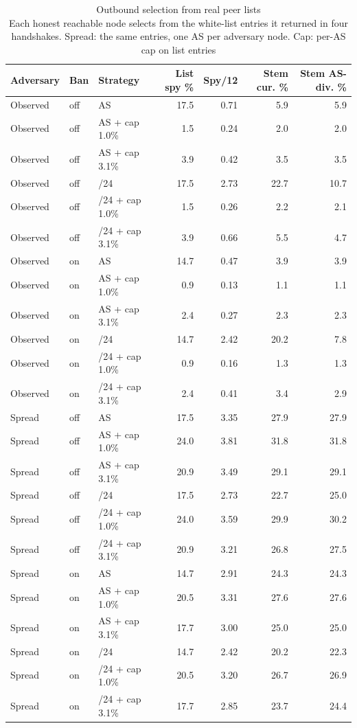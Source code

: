 \begin{table}[t]
\caption{
{\fontsize{20}{25}\selectfont  Outbound selection from real peer lists\small } \\ 
{\fontsize{14}{17}\selectfont  Each honest reachable node selects from the white-list entries it returned in four handshakes. Spread: the same entries, one AS per adversary node. Cap: per-AS cap on list entries\small }
} 
\begin{tabular*}{\linewidth}{@{\extracolsep{\fill}}lllrrrr}
\toprule
Adversary & Ban & Strategy & List spy \% & Spy/12 & Stem cur. \% & Stem AS-div. \% \\ 
\midrule\addlinespace[2.5pt]
Observed & off & AS & 17.5 & 0.71 & 5.9 & 5.9 \\ 
Observed & off & AS + cap 1.0\% & 1.5 & 0.24 & 2.0 & 2.0 \\ 
Observed & off & AS + cap 3.1\% & 3.9 & 0.42 & 3.5 & 3.5 \\ 
Observed & off & /24 & 17.5 & 2.73 & 22.7 & 10.7 \\ 
Observed & off & /24 + cap 1.0\% & 1.5 & 0.26 & 2.2 & 2.1 \\ 
Observed & off & /24 + cap 3.1\% & 3.9 & 0.66 & 5.5 & 4.7 \\ 
Observed & on & AS & 14.7 & 0.47 & 3.9 & 3.9 \\ 
Observed & on & AS + cap 1.0\% & 0.9 & 0.13 & 1.1 & 1.1 \\ 
Observed & on & AS + cap 3.1\% & 2.4 & 0.27 & 2.3 & 2.3 \\ 
Observed & on & /24 & 14.7 & 2.42 & 20.2 & 7.8 \\ 
Observed & on & /24 + cap 1.0\% & 0.9 & 0.16 & 1.3 & 1.3 \\ 
Observed & on & /24 + cap 3.1\% & 2.4 & 0.41 & 3.4 & 2.9 \\ 
Spread & off & AS & 17.5 & 3.35 & 27.9 & 27.9 \\ 
Spread & off & AS + cap 1.0\% & 24.0 & 3.81 & 31.8 & 31.8 \\ 
Spread & off & AS + cap 3.1\% & 20.9 & 3.49 & 29.1 & 29.1 \\ 
Spread & off & /24 & 17.5 & 2.73 & 22.7 & 25.0 \\ 
Spread & off & /24 + cap 1.0\% & 24.0 & 3.59 & 29.9 & 30.2 \\ 
Spread & off & /24 + cap 3.1\% & 20.9 & 3.21 & 26.8 & 27.5 \\ 
Spread & on & AS & 14.7 & 2.91 & 24.3 & 24.3 \\ 
Spread & on & AS + cap 1.0\% & 20.5 & 3.31 & 27.6 & 27.6 \\ 
Spread & on & AS + cap 3.1\% & 17.7 & 3.00 & 25.0 & 25.0 \\ 
Spread & on & /24 & 14.7 & 2.42 & 20.2 & 22.3 \\ 
Spread & on & /24 + cap 1.0\% & 20.5 & 3.20 & 26.7 & 26.9 \\ 
Spread & on & /24 + cap 3.1\% & 17.7 & 2.85 & 23.7 & 24.4 \\ 
\bottomrule
\end{tabular*}
\label{table-peerlists}
\end{table}
